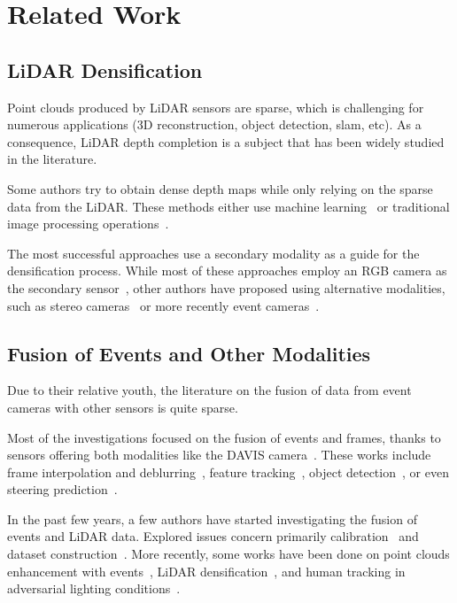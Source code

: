 \section{Related Work}\label{sec:aled:sota}

\subsection{LiDAR Densification}
Point clouds produced by LiDAR sensors are sparse, which is challenging for numerous applications (3D reconstruction, object detection, \acrshort{slam}, etc). As a consequence, LiDAR depth completion is a subject that has been widely studied in the literature.

Some authors try to obtain dense depth maps while only relying on the sparse data from the LiDAR. These methods either use machine learning~\cite{Uhrig2017SparsityIC,Chodosh2018DeepCC,Huang2020HMSNetHM} or traditional image processing operations~\cite{Ku2018InDO}.

The most successful approaches use a secondary modality as a guide for the densification process. While most of these approaches employ an RGB camera as the secondary sensor~\cite{Huang2020HMSNetHM,Jaritz2018SparseAD,VanGansbeke2019SparseAN,Xu2019DepthCF}, other authors have proposed using alternative modalities, such as stereo cameras~\cite{Maddern2016RealtimePF} or more recently event cameras~\cite{Cui2022DenseDE}.

\subsection{Fusion of Events and Other Modalities}
Due to their relative youth, the literature on the fusion of data from event cameras with other sensors is quite sparse.

Most of the investigations focused on the fusion of events and frames, thanks to sensors offering both modalities like the DAVIS camera~\cite{Brandli2014A2}. These works include frame interpolation and deblurring~\cite{Scheerlinck2018ContinuoustimeIE,Pan2019BringingAB,Paikin2021EFINetVF}, feature tracking~\cite{Kueng2016LowlatencyVO,Gehrig2019EKLTAP}, object detection~\cite{Jiang2019MixedFF,Cao2021FusionBasedFA,Tomy2022FusingEA}, or even steering prediction~\cite{Hu2020DDD20EE}.

In the past few years, a few authors have started investigating the fusion of events and LiDAR data. Explored issues concern primarily calibration~\cite{Song2018CalibrationOE,Ta2022L2ELT,Jiao2023LCECalibAL} and dataset construction~\cite{Zhu2018TheMS,Gehrig2021DSECAS,Chaney2023M3EDMM}. More recently, some works have been done on point clouds enhancement with events~\cite{Li2021Enhancing3L}, LiDAR densification~\cite{Cui2022DenseDE}, and human tracking in adversarial lighting conditions~\cite{Saucedo2023EventCA}.


